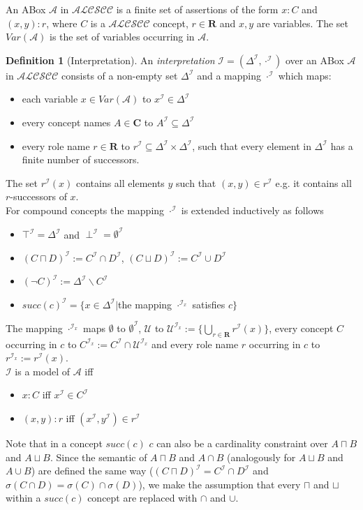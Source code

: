 \documentclass{book}
\theoremstyle{break}
\theoremstyle{definition}
\newtheorem{mydef}{Definition}
\begin{document}
An ABox $\mathcal{A}$ in $\mathcal{ALCSCC}$ is a finite set of assertions of the form $x:C$ and $(x,y):r$, where $C$ is a $\mathcal{ALCSCC}$ concept, $r\in\mathbf{R}$ and $x,y$ are variables. The set $Var(\mathcal{A})$ is the set of variables occurring in $\mathcal{A}$. 
\begin{mydef}[Interpretation]
An \textit{interpretation} $\mathcal{I}=(\Delta^\mathcal{I},\cdot^\mathcal{I})$ over an ABox $\mathcal{A}$ in $\mathcal{ALCSCC}$ consists of a non-empty set $\Delta^\mathcal{I}$ and a mapping $\cdot^\mathcal{I}$ which maps:
\begin{itemize}
\item each variable $x\in Var(\mathcal{A})$ to $x^\mathcal{I}\in \Delta^\mathcal{I}$
\item every concept names $A\in\mathbf{C}$ to $A^\mathcal{I}\subseteq \Delta^\mathcal{I}$
\item every role name $r\in\mathbf{R}$ to $r^\mathcal{I}\subseteq\Delta^\mathcal{I}\times\Delta^\mathcal{I}$, such that every element in $\Delta^\mathcal{I}$ has a finite number of successors.
\end{itemize}
The set $r^\mathcal{I}(x)$ contains all elements $y$ such that $(x,y)\in r^\mathcal{I}$ e.g. it contains all $r$-successors of $x$.\\
For compound concepts the mapping $\cdot^\mathcal{I}$ is extended inductively as follows
\begin{itemize}
\item $\top^\mathcal{I}=\Delta^\mathcal{I}$ and $\perp^\mathcal{I}=\emptyset^\mathcal{I}$
\item $(C\sqcap D)^\mathcal{I}:=C^\mathcal{I}\cap D^\mathcal{I}$, $(C\sqcup D)^\mathcal{I}:=C^\mathcal{I}\cup D^\mathcal{I}$
\item $(\neg C)^\mathcal{I}:=\Delta^\mathcal{I}\backslash C^\mathcal{I}$
\item $succ(c)^\mathcal{I}=\{x\in \Delta^\mathcal{I}|$the mapping $\cdot^{\mathcal{I}_x}$ satisfies $c\}$
\end{itemize}
The mapping $\cdot^{\mathcal{I}_x}$ maps $\emptyset$ to $\emptyset^\mathcal{I}$, $\mathcal{U}$ to $\mathcal{U}^{\mathcal{I}_x}:=\{\bigcup_{r\in\mathbf{R}}r^\mathcal{I}(x)\}$, every concept $C$ occurring in $c$ to $C^{\mathcal{I}_x}:=C^\mathcal{I}\cap \mathcal{U}^{\mathcal{I}_x}$ and every role name $r$ occurring in $c$ to $r^{\mathcal{I}_x}:=r^\mathcal{I}(x)$.\\
$\mathcal{I}$ is a model of $\mathcal{A}$ iff
\begin{itemize}
\item $x:C$ iff $x^\mathcal{I}\in C^\mathcal{I}$ 
\item $(x,y):r$ iff $(x^\mathcal{I},y^\mathcal{I})\in r^\mathcal{I}$
\end{itemize} 
\end{mydef}
Note that in a concept $succ(c)$ $c$ can also be a cardinality constraint over $A\sqcap B$ and $A\sqcup B$. Since the semantic of $A\sqcap B$ and $A\cap B$ (analogously for $A\sqcup B$ and $A\cup B$) are defined the same way ($(C\sqcap D)^\mathcal{I}=C^\mathcal{I}\cap D^\mathcal{I}$ and $\sigma(C\cap D)=\sigma(C)\cap\sigma(D)$), we make the assumption that every $\sqcap$ and $\sqcup$ within a $succ(c)$ concept are replaced with $\cap$ and $\cup$.
\end{document}
